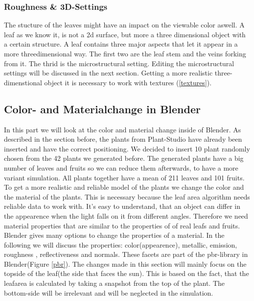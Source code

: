 \subsubsection*{Roughness \& 3D-Settings}
The stucture of the leaves might have an impact on the viewable color aswell. A leaf as we know it, is not a 2d surface, but more a three dimensional object with a certain structure. A leaf contains three major aspects that let it appear in a more threedimensional way. The first two are the leaf stem and the veins forking from it. The thrid is the microstructural setting. 
Editing the microstructural settings will be discussed in the next section. Getting a more realistic three-dimenstional object it is necessary to work with textures (\ref{textures}).

\subsection{Color- and Materialchange in Blender}


In this part we will look at the color and material change inside of Blender. As described in the section before, the plants from Plant-Studio have already been inserted and have the correct positioning. We decided to insert 10 plant randomly chosen from the 42 plants we generated before. The generated plants have a big number of leaves and fruits so we can reduce them afterwards, to have a more variant simulation. \newline
All plants together have a mean of 211 leaves and 101 fruits.
To get a more realistic and reliable model of the plants we change the color and the material of the plants. This is necessary because the leaf area algorithm needs reliable data to work with. It's easy to understand, that an object can differ in the appearence when the light falls on it from different angles. Therefore we need material properties that are similar to the properties of of real leafs and fruits.
Blender gives many options to change the properties of a material. In the following we will discuss the properties: color(appearence), metallic, emission, roughness , reflectiveness and normals. These facets are part of the pbr-library in Blender(Figure \ref{pbr}).
The changes made in this section will mainly focus on the topside of the leaf(the side that faces the sun). This is based on the fact, that the leafarea is calculated by taking a snapshot from the top of the plant. The bottom-side will be irrelevant and will be neglected in the simulation.

